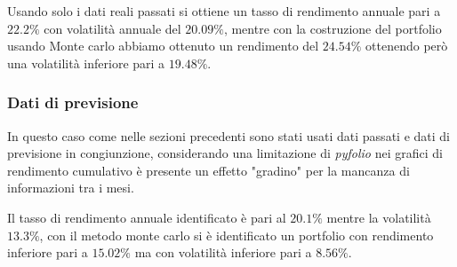Usando solo i dati reali passati si ottiene un tasso di rendimento annuale pari a $22.2\%$ con volatilità annuale del $20.09\%$, mentre con la costruzione
del portfolio usando Monte carlo abbiamo ottenuto un rendimento del $24.54\%$ ottenendo però una volatilità inferiore pari a $19.48\%$.

\subsubsection{Dati di previsione}

In questo caso come nelle sezioni precedenti sono stati usati dati passati e dati di previsione in congiunzione, considerando una limitazione di \emph{pyfolio} nei grafici di rendimento
cumulativo è presente un effetto "gradino" per la mancanza di informazioni tra i mesi.

Il tasso di rendimento annuale identificato è pari al $20.1\%$ mentre la volatilità $13.3\%$, con il metodo monte carlo si è identificato un portfolio con rendimento inferiore pari a $15.02\%$ ma con
volatilità inferiore pari a $8.56\%$.